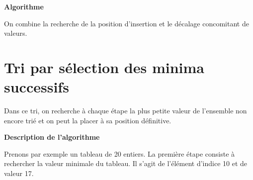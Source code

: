 		{\sffamily\bfseries
		Algorithme}

		On combine la recherche de la position d’insertion et le décalage
		concomitant de valeurs.


		\bigskip

	\section{Tri par sélection des minima successifs}
		
		Dans ce tri, on recherche à chaque étape la plus petite valeur de
		l’ensemble non encore trié et on peut la placer à sa position
		définitive.

		{\sffamily\bfseries\upshape
		Description de l’algorithme}

		Prenons par exemple un tableau de 20 entiers. La première étape consiste
		à rechercher la valeur minimale du tableau. Il s’agit de l’élément
		d’indice 10 et de valeur 17.
		
